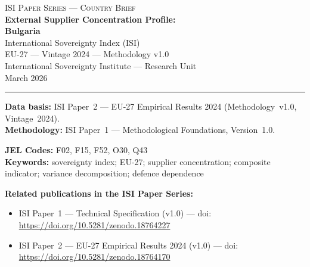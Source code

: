 \documentclass[12pt,a4paper]{article}
\begin{document}
\hypersetup{pageanchor=false}

\begin{titlepage}
\centering
\vspace*{2cm}
{\Large\textsc{ISI Paper Series --- Country Brief}}\\[1.2cm]
{\LARGE\bfseries External Supplier Concentration Profile:\\[0.3em]
Bulgaria}\\[1.5cm]
{\large International Sovereignty Index (ISI)\\[0.3em]
EU-27 --- Vintage 2024 --- Methodology v1.0}\\[1.2cm]
{\large International Sovereignty Institute --- Research Unit}\\[0.8cm]
{\large March 2026}

\vspace{0.8cm}
\noindent\rule{\textwidth}{0.4pt}
\vspace{0.4cm}

\begin{flushleft}
\noindent\textbf{Data basis:} ISI Paper~2 --- EU-27 Empirical Results 2024 (Methodology~v1.0, Vintage~2024).\\[4pt]
\noindent\textbf{Methodology:} ISI Paper~1 --- Methodological Foundations, Version~1.0.

\medskip

\noindent\textbf{JEL Codes:} F02, F15, F52, O30, Q43\\[4pt]
\noindent\textbf{Keywords:} sovereignty index; EU-27; supplier concentration; composite indicator; variance decomposition; defence dependence

\medskip

\noindent\textbf{Related publications in the ISI Paper Series:}
\begin{itemize}[nosep,leftmargin=1.5em]
\item ISI Paper~1 --- Technical Specification (v1.0) --- doi:\\
  \url{https://doi.org/10.5281/zenodo.18764227}
\item ISI Paper~2 --- EU-27 Empirical Results 2024 (v1.0) --- doi:\\
  \url{https://doi.org/10.5281/zenodo.18764170}
\end{itemize}
\end{flushleft}
\vfill
\end{titlepage}
\end{document}
